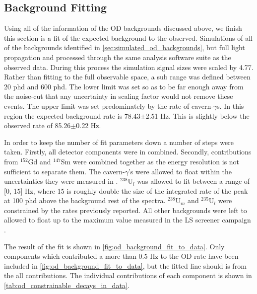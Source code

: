 \subsection{Background Fitting}
\par
Using all of the information of the OD backgrounds discussed above, we finish this section is a fit of the expected background to the observed.
Simulations of all of the backgrounds identified in \autoref{sec:simulated_od_backgrounds}, but full light propagation and processed through the same analysis software suite as the observed data.
During this process the simulation signal sizes were scaled by 4.77.
Rather than fitting to the full observable space, a sub range was defined between 20 phd and 600 phd.
The lower limit was set so as to be far enough away from the noise-cut that any uncertainty in scaling factor would not remove these events.
The upper limit was set predominately by the rate of cavern-$\gamma$s.
In this region the expected background rate is 78.43$\pm$2.51 Hz.
This is slightly below the observed rate of 85.26$\pm$0.22 Hz.
\par
In order to keep the number of fit parameters down a number of steps were taken.
Firstly, all detector components were in combined. 
Secondly, contributions from ${}^{152}$Gd and ${}^{147}$Sm were combined together as the energy resolution is not sufficient to separate them.
The cavern-$\gamma$'s were allowed to float within the uncertainties they were measured in \cite{LZ_Gamma_Ray_Background_ref}.
${}^{238}$U$_l$ was allowed to fit between a range of [0, 15] Hz, where 15 is roughly double the size of the integrated rate of the peak at 100 phd above the background rest of the spectra.
${}^{238}$U$_{m}$ and ${}^{235}$U$_{l}$ were constrained by the rates previously reported.
All other backgrounds were left to allowed to float up to the maximum value measured in the LS screener campaign \cite{scotthaselschwardt_thesis_ref}.
\par
The result of the fit is shown in \autoref{fig:od_background_fit_to_data}.
Only components which contributed a more than 0.5 Hz to the OD rate have been included in \autoref{fig:od_background_fit_to_data}, but the fitted line should is from the all contributions.
The individual contributions of each component is shown in \autoref{tab:od_constrainable_decays_in_data}.

